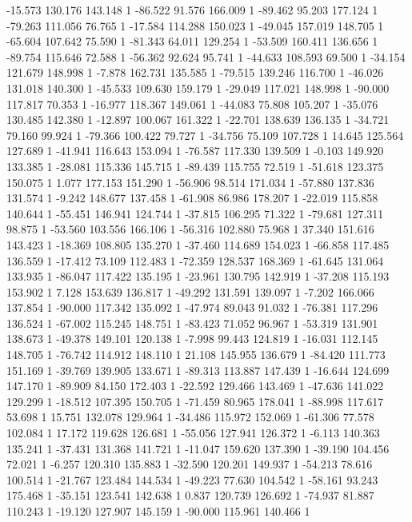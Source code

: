 	-15.573 130.176 143.148 1
	-86.522 91.576 166.009 1
	-89.462 95.203 177.124 1
	-79.263 111.056 76.765 1
	-17.584 114.288 150.023 1
	-49.045 157.019 148.705 1
	-65.604 107.642 75.590 1
	-81.343 64.011 129.254 1
	-53.509 160.411 136.656 1
	-89.754 115.646 72.588 1
	-56.362 92.624 95.741 1
	-44.633 108.593 69.500 1
	-34.154 121.679 148.998 1
	-7.878 162.731 135.585 1
	-79.515 139.246 116.700 1
	-46.026 131.018 140.300 1
	-45.533 109.630 159.179 1
	-29.049 117.021 148.998 1
	-90.000 117.817 70.353 1
	-16.977 118.367 149.061 1
	-44.083 75.808 105.207 1
	-35.076 130.485 142.380 1
	-12.897 100.067 161.322 1
	-22.701 138.639 136.135 1
	-34.721 79.160 99.924 1
	-79.366 100.422 79.727 1
	-34.756 75.109 107.728 1
	14.645 125.564 127.689 1
	-41.941 116.643 153.094 1
	-76.587 117.330 139.509 1
	-0.103 149.920 133.385 1
	-28.081 115.336 145.715 1
	-89.439 115.755 72.519 1
	-51.618 123.375 150.075 1
	1.077 177.153 151.290 1
	-56.906 98.514 171.034 1
	-57.880 137.836 131.574 1
	-9.242 148.677 137.458 1
	-61.908 86.986 178.207 1
	-22.019 115.858 140.644 1
	-55.451 146.941 124.744 1
	-37.815 106.295 71.322 1
	-79.681 127.311 98.875 1
	-53.560 103.556 166.106 1
	-56.316 102.880 75.968 1
	37.340 151.616 143.423 1
	-18.369 108.805 135.270 1
	-37.460 114.689 154.023 1
	-66.858 117.485 136.559 1
	-17.412 73.109 112.483 1
	-72.359 128.537 168.369 1
	-61.645 131.064 133.935 1
	-86.047 117.422 135.195 1
	-23.961 130.795 142.919 1
	-37.208 115.193 153.902 1
	7.128 153.639 136.817 1
	-49.292 131.591 139.097 1
	-7.202 166.066 137.854 1
	-90.000 117.342 135.092 1
	-47.974 89.043 91.032 1
	-76.381 117.296 136.524 1
	-67.002 115.245 148.751 1
	-83.423 71.052 96.967 1
	-53.319 131.901 138.673 1
	-49.378 149.101 120.138 1
	-7.998 99.443 124.819 1
	-16.031 112.145 148.705 1
	-76.742 114.912 148.110 1
	21.108 145.955 136.679 1
	-84.420 111.773 151.169 1
	-39.769 139.905 133.671 1
	-89.313 113.887 147.439 1
	-16.644 124.699 147.170 1
	-89.909 84.150 172.403 1
	-22.592 129.466 143.469 1
	-47.636 141.022 129.299 1
	-18.512 107.395 150.705 1
	-71.459 80.965 178.041 1
	-88.998 117.617 53.698 1
	15.751 132.078 129.964 1
	-34.486 115.972 152.069 1
	-61.306 77.578 102.084 1
	17.172 119.628 126.681 1
	-55.056 127.941 126.372 1
	-6.113 140.363 135.241 1
	-37.431 131.368 141.721 1
	-11.047 159.620 137.390 1
	-39.190 104.456 72.021 1
	-6.257 120.310 135.883 1
	-32.590 120.201 149.937 1
	-54.213 78.616 100.514 1
	-21.767 123.484 144.534 1
	-49.223 77.630 104.542 1
	-58.161 93.243 175.468 1
	-35.151 123.541 142.638 1
	0.837 120.739 126.692 1
	-74.937 81.887 110.243 1
	-19.120 127.907 145.159 1
	-90.000 115.961 140.466 1
